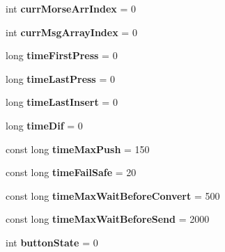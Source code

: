 \begin{DoxyCompactItemize}
int {\bfseries curr\+Morse\+Arr\+Index} = 0
\item 
\mbox{\label{_arduino_morse_client_8ino_a0e44f00a53694df6ce78b11d02239605}} 
int {\bfseries curr\+Msg\+Array\+Index} = 0
\item 
\mbox{\label{_arduino_morse_client_8ino_a4519918721f91dae25e6eb085f60efd0}} 
long {\bfseries time\+First\+Press} = 0
\item 
\mbox{\label{_arduino_morse_client_8ino_a0bc9b0b1e5cf6d2a43ae395d5b92adfa}} 
long {\bfseries time\+Last\+Press} = 0
\item 
\mbox{\label{_arduino_morse_client_8ino_a8ab75efd2de57cd9e2931f5b101e55a5}} 
long {\bfseries time\+Last\+Insert} = 0
\item 
\mbox{\label{_arduino_morse_client_8ino_a3c1aad3dc8933e1a80684c4524899cc0}} 
long {\bfseries time\+Dif} = 0
\item 
\mbox{\label{_arduino_morse_client_8ino_adaa28d39a68ea298c4efea85b798aa7d}} 
const long {\bfseries time\+Max\+Push} = 150
\item 
\mbox{\label{_arduino_morse_client_8ino_a5a2c0943e6069c9e8606218651a40f4a}} 
const long {\bfseries time\+Fail\+Safe} = 20
\item 
\mbox{\label{_arduino_morse_client_8ino_a611e71e8ab7240e999fa22364bb844f4}} 
const long {\bfseries time\+Max\+Wait\+Before\+Convert} = 500
\item 
\mbox{\label{_arduino_morse_client_8ino_a3dbf8f67f57d2d1832d79d062794ee47}} 
const long {\bfseries time\+Max\+Wait\+Before\+Send} = 2000
\item 
\mbox{\label{_arduino_morse_client_8ino_a5002611f83f5a861df12917dd5651db8}} 
int {\bfseries button\+State} = 0
\item 
\mbox{\label{_arduino_morse_client_8ino_a986feb0ed834c2e1498a4158aad806c4}} 

\end{DoxyCompactItemize}
